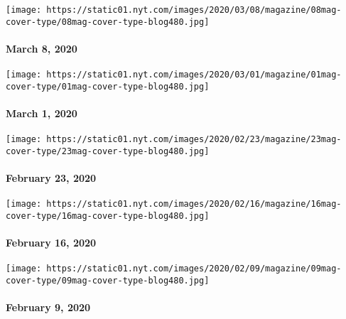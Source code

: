 \href{https://www.nytimes.com/issue/magazine/2020/03/05/the-3820-issue}{}

\texttt{[image: https://static01.nyt.com/images/2020/03/08/magazine/08mag-cover-type/08mag-cover-type-blog480.jpg]}

\hypertarget{march-8-2020}{%
\paragraph{March 8, 2020}\label{march-8-2020}}

\href{https://www.nytimes.com/issue/magazine/2020/02/27/the-3120-issue}{}

\texttt{[image: https://static01.nyt.com/images/2020/03/01/magazine/01mag-cover-type/01mag-cover-type-blog480.jpg]}

\hypertarget{march-1-2020}{%
\paragraph{March 1, 2020}\label{march-1-2020}}

\href{https://www.nytimes.com/issue/magazine/2020/02/20/the-22320-issue}{}

\texttt{[image: https://static01.nyt.com/images/2020/02/23/magazine/23mag-cover-type/23mag-cover-type-blog480.jpg]}

\hypertarget{february-23-2020}{%
\paragraph{February 23, 2020}\label{february-23-2020}}

\href{https://www.nytimes.com/issue/magazine/2020/02/13/the-21620-issue}{}

\texttt{[image: https://static01.nyt.com/images/2020/02/16/magazine/16mag-cover-type/16mag-cover-type-blog480.jpg]}

\hypertarget{february-16-2020}{%
\paragraph{February 16, 2020}\label{february-16-2020}}

\href{https://www.nytimes.com/issue/magazine/2020/02/06/the-2920-issue}{}

\texttt{[image: https://static01.nyt.com/images/2020/02/09/magazine/09mag-cover-type/09mag-cover-type-blog480.jpg]}

\hypertarget{february-9-2020}{%
\paragraph{February 9, 2020}\label{february-9-2020}}

